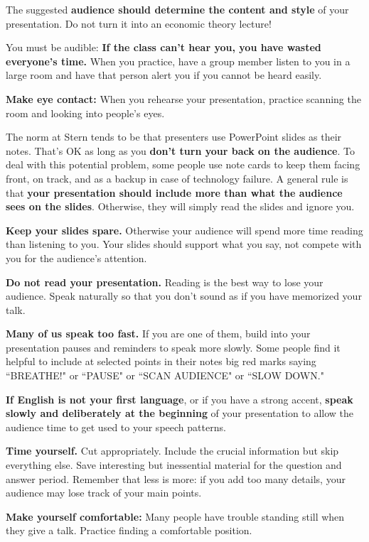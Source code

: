 \documentclass[letterpaper,12pt]{article}
\begin{document}
The suggested {\bf audience should determine the content and style} of your presentation. Do not
turn it into an economic theory lecture!

You must be audible:  {\bf If the class can't hear you, you have
wasted everyone's time.} When you practice, have a group member
listen to you in a large room and have that person alert you if
you cannot be heard easily.

{\bf Make eye contact:}  When you rehearse
your presentation, practice scanning the room and looking into people's
eyes.  

The norm at Stern tends to be that presenters use PowerPoint
slides as their notes.  That's OK as long as you {\bf don't turn
your back on the audience}.  To deal with this potential problem,
some people use note cards to keep them facing front, on track,
and as a backup in case of technology failure.  A general rule is
that {\bf your presentation should include more than what the audience
sees on the slides}.  Otherwise, they will simply read the slides
and ignore you.

{\bf Keep your slides spare.}  Otherwise your audience will spend more time reading than listening
to you.  Your slides should support what you say, not compete with you for the audience's attention.

{\bf Do not read your presentation.}  Reading is the best way to lose your audience.  Speak
naturally so that you don't sound as if you have memorized your talk.

{\bf Many of us speak too fast.}  If you are one of them, build
into your presentation pauses and reminders to speak more slowly.
Some people find it helpful to include at selected points in their
notes big red marks saying ``BREATHE!" or ``PAUSE" or ``SCAN
AUDIENCE" or ``SLOW DOWN."

{\bf If English is not your first language}, or if you have a strong accent, {\bf speak slowly and
deliberately at the beginning} of your presentation to allow the audience time to get used to your
speech patterns.

{\bf Time yourself.}  Cut appropriately.  Include the crucial information but skip everything
else.  Save interesting but inessential material for the question and answer period.  Remember
that less is more:  if you add too many details, your audience may lose track of your main points.

{\bf Make yourself comfortable:}  Many people have trouble standing still
when they give a talk.  Practice finding a comfortable position.
\end{document}
